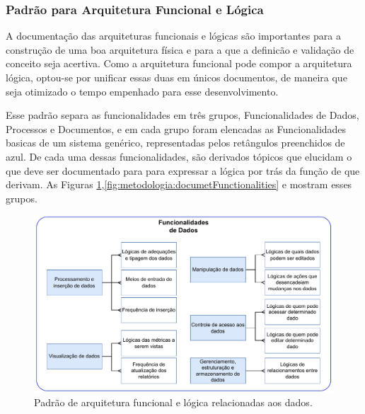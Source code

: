 	\subsubsection{{\color{blue}Padrão para Arquitetura Funcional e Lógica}}

	A documentação das arquiteturas funcionais e lógicas são importantes para a construção de uma boa arquitetura física e para a que a definicão e validação de conceito seja acertiva. Como a 
	arquitetura funcional pode compor a arquitetura lógica, optou-se por unificar essas duas em únicos documentos, de maneira que seja otimizado o tempo empenhado para esse desenvolvimento.

	Esse padrão separa as funcionalidades em três grupos, Funcionalidades de Dados, Processos e Documentos, e em cada grupo foram elencadas as Funcionalidades basicas de um sistema genérico,
	representadas pelos retângulos preenchidos de azul. De cada uma dessas funcionalidades, são derivados tópicos que elucidam o que deve ser documentado para para expressar a lógica por trás
	da função de que derivam. As Figuras \ref{fig:metodologia:dataFunctionalities},\ref{fig:metodologia:documetFunctionalities} e \label{fig:metodologia:processFunctionalities} mostram esses grupos.
	

	\begin{figure}[H]
		\centering
		\includegraphics[width=1\textwidth]{./figuras/dataFunctionalities.pdf}
		\caption{Padrão de arquitetura funcional e lógica relacionadas aos dados.}
		\label{fig:metodologia:dataFunctionalities}
	\end{figure}

